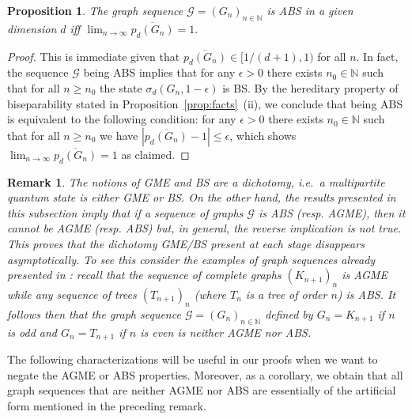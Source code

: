 \documentclass[a4paper,onecolumn,accepted=2024-12-14]{quantumarticle}
\newtheorem{proposition}[theorem]{Proposition}
\newtheorem{remark}[theorem]{Remark}%
\theoremstyle{plain}
\newcommand{\cG}{{\mathcal G}}         %
\newcommand{\N}{\mathbb{N}} %
\begin{document}
\begin{proposition}\label{characterizationABS}
The graph sequence $\cG=(G_n)_{n\in\N}$ is ABS in a given dimension $d$ iff \linebreak
$\lim_{n\to\infty}\overline{p_d(G_n)}=1.$
\end{proposition}
\begin{proof}
This is immediate given that $\overline{p_d(G_n)}\in[1/(d+1),1)$ for all $n$.
In fact, the sequence $\cG$ being ABS implies that
for any $\epsilon>0$ there exists $n_0\in\mathbb{N}$ such that for
all $n\geq n_0$ the state $\sigma_d(G_n,1-\epsilon)$ is BS.
By the hereditary property of biseparability stated in Proposition~\ref{prop:facts}~(ii), we conclude that being ABS is equivalent
to the following condition: for any $\epsilon>0$ there exists $n_0\in\mathbb{N}$ such that for all $n\geq n_0$ we have
$|\overline{p_d(G_n)}-1|\leq\epsilon$, which shows $\lim_{n\to\infty}\overline{p_d(G_n)}=1$ as claimed.
\end{proof}

\begin{remark}\label{rem:dico}
The notions of GME and BS are a dichotomy, i.e.\ a multipartite quantum state is either GME or BS. On the other hand, the results presented in this subsection
imply that if a sequence of graphs $\cG$ is ABS (resp. AGME), then it cannot be AGME (resp. ABS) but, in general, the reverse implication is not true. This proves that
the dichotomy GME/BS present at each stage disappears asymptotically. To see this consider the examples of graph sequences already presented in \cite{ASGME}: recall that
the sequence of complete graphs $(K_{n+1})_{n}$ is AGME while any sequence of trees $(T_{n+1})_n$ (where $T_n$ is a tree of order $n$) is ABS. It follows then that the graph sequence $\cG=(G_n)_{n\in\N}$ defined by $G_n=K_{n+1}$ if $n$ is odd and $G_n=T_{n+1}$ if $n$ is even is neither AGME nor ABS.
\end{remark}

The following characterizations will be useful in our proofs when we want to negate the AGME or ABS properties. Moreover, as a corollary, we obtain that all graph sequences that are neither AGME nor ABS are essentially of the artificial form mentioned in the preceding remark.
\end{document}
